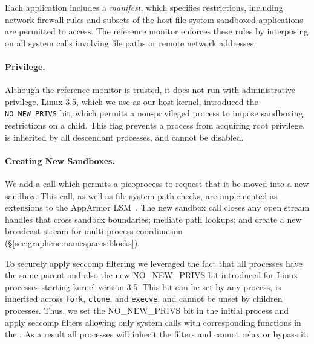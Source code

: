 Each application includes a {\em manifest}, which specifies restrictions,
including network firewall rules and subsets of the host file system sandboxed
applications are permitted to access.  The reference monitor enforces these
rules by interposing on all system calls involving file paths or remote network addresses.

\paragraph{Privilege.~} 
Although the reference monitor is trusted, it does not run 
with administrative privilege.
Linux 3.5, which we use as our host kernel, 
introduced the {\tt NO\_NEW\_PRIVS} bit, which permits
a non-privileged process to impose sandboxing restrictions on a child.
This flag prevents a process from acquiring root privilege, %
is inherited by all descendant processes,
and cannot be disabled.

\paragraph{Creating New Sandboxes.~} We add a \pal{} call which
permits a picoprocess to request that it be moved into a new sandbox.
This call, as well as file system path checks, are implemented
as extensions to the  AppArmor LSM~\citep{apparmor}.
The new sandbox call closes any open stream handles that cross sandbox boundaries;
mediate path lookups;
and create a new broadcast stream for multi-process
 coordination (\S\ref{sec:graphene:namespaces:blocks}).

To securely apply seccomp filtering we leveraged the fact that all
\sysname{} processes have the same parent and also the new
NO\_NEW\_PRIVS bit introduced for Linux processes starting kernel
version 3.5. This bit can be set by any process, is inherited across
{\tt fork}, {\tt clone}, and {\tt execve}, and cannot be unset by
children processes. Thus, we set the NO\_NEW\_PRIVS bit in the initial
\sysname{} process and apply seccomp filters allowing only system calls
with corresponding functions in the \pal{}. As a result all \sysname{}
processes will inherit the filters and cannot relax or bypass it.



